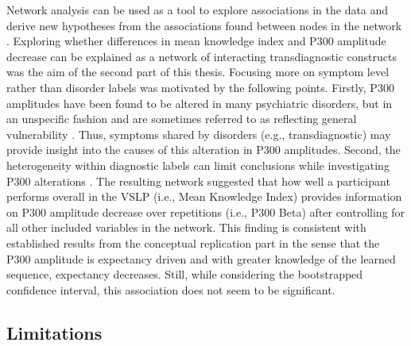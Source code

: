 Network analysis can be used as a tool to explore associations in the data and derive new hypotheses from the associations found between nodes in the network \parencite{isvoranuNetworkPsychometricsGuide2022}. Exploring whether differences in mean knowledge index and P300 amplitude decrease can be explained as a network of interacting transdiagnostic constructs was the aim of the second part of this thesis. Focusing more on symptom level rather than disorder labels was motivated by the following points. Firstly, P300 amplitudes have been found to be altered in many psychiatric disorders, but in an unspecific fashion \parencite{duncanEventrelatedPotentialsClinical2009} and are sometimes referred to as reflecting general vulnerability \parencite[e.g.,][]{patrickP300AmplitudeIndicator2006}. Thus, symptoms shared by disorders (e.g., transdiagnostic) may provide insight into the causes of this alteration in P300 amplitudes. Second, the heterogeneity within diagnostic labels can limit conclusions while investigating P300 alterations \parencite[e.g.,][]{kaiserEarlierLaterCognitive2020}. 
The resulting network suggested that how well a participant performs overall in the VSLP (i.e., Mean Knowledge Index) provides information on P300 amplitude decrease over repetitions (i.e., P300 Beta) after controlling for all other included variables in the network. This finding is consistent with established results from the conceptual replication part in the sense that the P300 amplitude is expectancy driven and with greater knowledge of the learned sequence, expectancy decreases. Still, while considering the bootstrapped confidence interval, this association does not seem to be significant. 
\subsection{Limitations}
